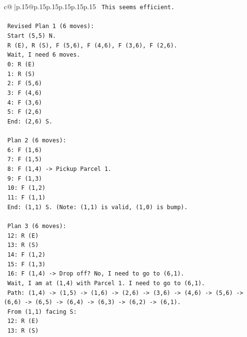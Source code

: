 \documentclass{article}
\begin{document}
{\begin{supertabular}{c@{$\;$}|p{.15\linewidth}@{}p{.15\linewidth}p{.15\linewidth}p{.15\linewidth}p{.15\linewidth}p{.15\linewidth}}
{{{\texttt{      This seems efficient.} \\
\\ 
\texttt{      Revised Plan 1 (6 moves):} \\
\texttt{      Start (5,5) N.} \\
\texttt{      R (E), R (S), F (5,6), F (4,6), F (3,6), F (2,6).} \\
\texttt{      Wait, I need 6 moves.} \\
\texttt{      0: R (E)} \\
\texttt{      1: R (S)} \\
\texttt{      2: F (5,6)} \\
\texttt{      3: F (4,6)} \\
\texttt{      4: F (3,6)} \\
\texttt{      5: F (2,6)} \\
\texttt{      End: (2,6) S.} \\
\\ 
\texttt{      Plan 2 (6 moves):} \\
\texttt{      6: F (1,6)} \\
\texttt{      7: F (1,5)} \\
\texttt{      8: F (1,4) {-}> Pickup Parcel 1.} \\
\texttt{      9: F (1,3)} \\
\texttt{      10: F (1,2)} \\
\texttt{      11: F (1,1)} \\
\texttt{      End: (1,1) S. (Note: (1,1) is valid, (1,0) is bump).} \\
\\ 
\texttt{      Plan 3 (6 moves):} \\
\texttt{      12: R (E)} \\
\texttt{      13: R (S)} \\
\texttt{      14: F (1,2)} \\
\texttt{      15: F (1,3)} \\
\texttt{      16: F (1,4) {-}> Drop off? No, I need to go to (6,1).} \\
\texttt{      Wait, I am at (1,4) with Parcel 1. I need to go to (6,1).} \\
\texttt{      Path: (1,4) {-}> (1,5) {-}> (1,6) {-}> (2,6) {-}> (3,6) {-}> (4,6) {-}> (5,6) {-}> (6,6) {-}> (6,5) {-}> (6,4) {-}> (6,3) {-}> (6,2) {-}> (6,1).} \\
\texttt{      From (1,1) facing S:} \\
\texttt{      12: R (E)} \\
\texttt{      13: R (S)} \\
}}}
\end{supertabular}}
\end{document}

